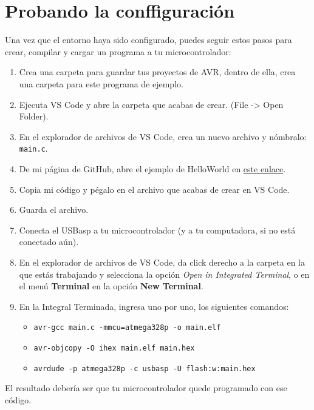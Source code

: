 \documentclass[10pt,letterpaper]{article}
\begin{document}
\section{Probando la conffiguración}
Una vez que el entorno haya sido configurado, puedes seguir estos pasos para crear, compilar y cargar un programa a tu microcontrolador:
\begin{enumerate}
    \item Crea una carpeta para guardar tus proyectos de AVR, dentro de ella, crea una carpeta para este programa de ejemplo.
    \item Ejecuta VS Code y abre la carpeta que acabas de crear. (File -> Open Folder).
    \item En el explorador de archivos de VS Code, crea un nuevo archivo y nómbralo: {\color{ForestGreen}\texttt{main.c}}.
    \item De mi página de GitHub, abre el ejemplo de HelloWorld en \href{https://github.com/dagmtz/I7266/blob/master/004_Examples/mega328P/001_HelloWorld/main.c}{este enlace}.
    \item Copia mi código y pégalo en el archivo que acabas de crear en VS Code.
    \item Guarda el archivo.
    \item Conecta el USBasp a tu microcontrolador (y a tu computadora, si no está conectado aún).
    \item En el explorador de archivos de VS Code, da click derecho a la carpeta en la que estás trabajando y selecciona la opción \textit{Open in Integrated Terminal}, o en el menú \textbf{Terminal} en la opción \textbf{New Terminal}.
    \item En la Integral Terminada, ingresa uno por uno, los siguientes comandos: 
    \begin{itemize}
        \item \texttt{avr-gcc main.c -mmcu=atmega328p -o main.elf}
        \item \texttt{avr-objcopy -O ihex main.elf main.hex}
        \item \texttt{avrdude -p atmega328p -c usbasp -U flash:w:main.hex}
    \end{itemize}
\end{enumerate}
El resultado debería ser que tu microcontrolador quede programado con ese código.
\end{document}
